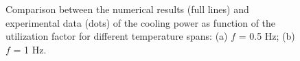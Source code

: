 \documentclass[review,preprint,12pt]{elsarticle}
\begin{document}
\begin{figure}[htp]
\centering
{}\\
\\
\caption{Comparison between the numerical results (full lines) and \cite{Trevizoli2015} experimental data (dots) of the cooling power as function of the utilization factor for different temperature spans: (a) $f$ = 0.5 Hz; (b) $f$ = 1 Hz.}
\label{fig:pg255}
\end{figure}
\end{document}
